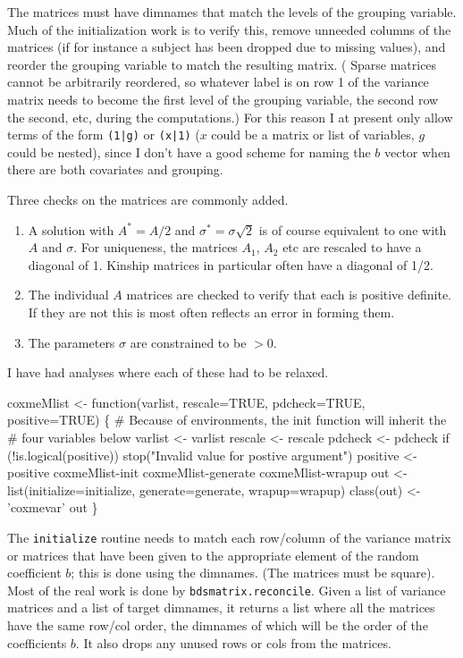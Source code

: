 \documentclass{article}
\begin{document}
The matrices must have dimnames that match the levels of the 
grouping variable.  Much of the initialization work is to verify
this, remove unneeded columns of the matrices (if for instance a
subject has been dropped due to missing values), and reorder the
grouping variable to match the resulting matrix. ( Sparse matrices
cannot be arbitrarily reordered, so whatever label is on row 1 of the
variance matrix needs to become the first level of the grouping
variable, the second row the second, etc, during the computations.)
For this reason I at present only allow terms of the form 
{\tt{}(1|g)} or {\tt{}(x|1)} ($x$ could be a matrix or list of variables,
$g$ could be nested), since I don't have a good scheme for naming  %
the $b$ vector when there are both covariates and grouping.

Three checks on the matrices are commonly added.  
\begin{enumerate}
\item A solution with $A^*= A/2$ and $\sigma^* = \sigma \sqrt{2}$ is
of course equivalent to one with $A$ and $\sigma$.
For uniqueness, the matrices $A_1$, $A_2$ etc are rescaled to have a
diagonal of 1.  Kinship matrices in particular often have a diagonal of 1/2.
\item The individual $A$ matrices are checked to verify that each is
positive definite.  If they are not this is most often reflects an 
error in forming them.
\item The parameters $\sigma$ are constrained to be $>0$.
\end{enumerate}
I have had analyses where each of these had to be relaxed.

\nwenddocs{}\endmoddef
coxmeMlist <- function(varlist, rescale=TRUE, pdcheck=TRUE,  positive=TRUE) \{
    # Because of environments, the init function will inherit the
    #  four variables below 
    varlist <- varlist
    rescale <- rescale
    pdcheck <- pdcheck
    if (!is.logical(positive)) stop("Invalid value for postive argument")
    positive <- positive
    \LA{}coxmeMlist-init\RA{}
    \LA{}coxmeMlist-generate\RA{}
    \LA{}coxmeMlist-wrapup\RA{}
    out <- list(initialize=initialize, generate=generate, wrapup=wrapup)
    class(out) <- 'coxmevar'
    out
    \}
\nwendcode{}\nwdocspar

The {\tt{}initialize} routine needs to match each row/column of the variance
matrix or matrices that have been given to the appropriate element of
the random coefficient $b$; this is done using the dimnames.
(The matrices must be square).
Most of the real work is done by {\tt{}bdsmatrix.reconcile}.  Given a list
of variance matrices and a list of target dimnames, it returns a list
where all the matrices have the same row/col order, the dimnames of
which will be the order of the coefficients $b$.  It also drops any
unused rows or cols from the matrices.
  
\end{document}
